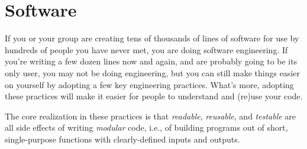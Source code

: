 \documentclass[10pt,letterpaper]{article}
\newcommand{\practicesection}[2]{\section{#1}\label{#2}}
\begin{document}
\practicesection{Software}{sec:software}

If you or your group are creating tens of thousands of lines of
software for use by hundreds of people you have never met, you are
doing software engineering. If you're writing a few dozen lines now
and again, and are probably going to be its only user, you may not be
doing engineering, but you can still make things easier on yourself by
adopting a few key engineering practices. What's more, adopting these
practices will make it easier for people to understand and (re)use
your code.

The core realization in these practices is that \emph{readable},
\emph{reusable}, and \emph{testable} are all side effects of writing
\emph{modular} code, i.e., of building programs out of short,
single-purpose functions with clearly-defined inputs and outputs.
\end{document}
